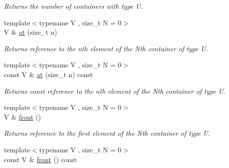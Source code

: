 \begin{DoxyCompactItemize}
\begin{DoxyCompactList}\small\item\em Returns the number of containers with type U. \end{DoxyCompactList}\item 
\hypertarget{classheterogeneous_1_1heterovector_3_01_t_00_01_u_00_01_types_8_8_8_4_a2916f0be53180042b721cbef198e7d42}{}{\footnotesize template$<$typename V , size\+\_\+t N = 0$>$ }\\V \& \hyperlink{classheterogeneous_1_1heterovector_3_01_t_00_01_u_00_01_types_8_8_8_4_a2916f0be53180042b721cbef198e7d42}{at} (size\+\_\+t n)\label{classheterogeneous_1_1heterovector_3_01_t_00_01_u_00_01_types_8_8_8_4_a2916f0be53180042b721cbef198e7d42}

\begin{DoxyCompactList}\small\item\em Returns reference to the nth element of the Nth container of type U. \end{DoxyCompactList}\item 
\hypertarget{classheterogeneous_1_1heterovector_3_01_t_00_01_u_00_01_types_8_8_8_4_a0e25f246081849549b5ff733c9a6d635}{}{\footnotesize template$<$typename V , size\+\_\+t N = 0$>$ }\\const V \& \hyperlink{classheterogeneous_1_1heterovector_3_01_t_00_01_u_00_01_types_8_8_8_4_a0e25f246081849549b5ff733c9a6d635}{at} (size\+\_\+t n) const \label{classheterogeneous_1_1heterovector_3_01_t_00_01_u_00_01_types_8_8_8_4_a0e25f246081849549b5ff733c9a6d635}

\begin{DoxyCompactList}\small\item\em Returns const reference to the nth element of the Nth container of type U. \end{DoxyCompactList}\item 
\hypertarget{classheterogeneous_1_1heterovector_3_01_t_00_01_u_00_01_types_8_8_8_4_aadb9703644bb381760d15e3b5ce10120}{}{\footnotesize template$<$typename V , size\+\_\+t N = 0$>$ }\\V \& \hyperlink{classheterogeneous_1_1heterovector_3_01_t_00_01_u_00_01_types_8_8_8_4_aadb9703644bb381760d15e3b5ce10120}{front} ()\label{classheterogeneous_1_1heterovector_3_01_t_00_01_u_00_01_types_8_8_8_4_aadb9703644bb381760d15e3b5ce10120}

\begin{DoxyCompactList}\small\item\em Returns reference to the first element of the Nth container of type U. \end{DoxyCompactList}\item 
\hypertarget{classheterogeneous_1_1heterovector_3_01_t_00_01_u_00_01_types_8_8_8_4_ada52195ad3d3401bec1339c84c868ddd}{}{\footnotesize template$<$typename V , size\+\_\+t N = 0$>$ }\\const V \& \hyperlink{classheterogeneous_1_1heterovector_3_01_t_00_01_u_00_01_types_8_8_8_4_ada52195ad3d3401bec1339c84c868ddd}{front} () const \label{classheterogeneous_1_1heterovector_3_01_t_00_01_u_00_01_types_8_8_8_4_ada52195ad3d3401bec1339c84c868ddd}


\end{DoxyCompactItemize}
